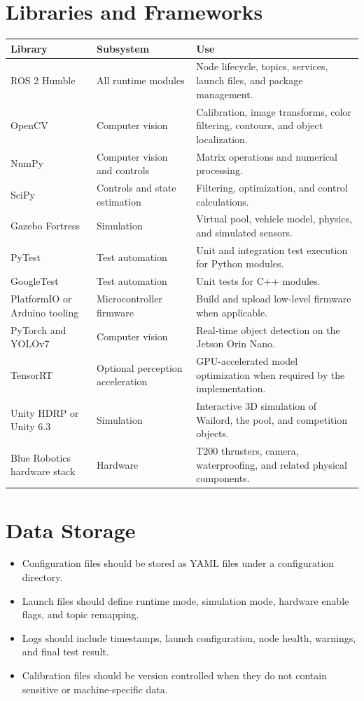 \documentclass[12pt]{article}
\begin{document}
\section{Libraries and Frameworks}
\begin{longtable}{|p{}|p{}|p{}|}
\hline
\textbf{Library} & \textbf{Subsystem} & \textbf{Use} \\
\hline
ROS 2 Humble & All runtime modules & Node lifecycle, topics, services, launch files, and package management. \\
\hline
OpenCV & Computer vision & Calibration, image transforms, color filtering, contours, and object localization. \\
\hline
NumPy & Computer vision and controls & Matrix operations and numerical processing. \\
\hline
SciPy & Controls and state estimation & Filtering, optimization, and control calculations. \\
\hline
Gazebo Fortress & Simulation & Virtual pool, vehicle model, physics, and simulated sensors. \\
\hline
PyTest & Test automation & Unit and integration test execution for Python modules. \\
\hline
GoogleTest & Test automation & Unit tests for C++ modules. \\
\hline
PlatformIO or Arduino tooling & Microcontroller firmware & Build and upload low-level firmware when applicable. \\
\hline
PyTorch and YOLOv7 & Computer vision & Real-time object detection on the Jetson Orin Nano. \\
\hline
TensorRT & Optional perception acceleration & GPU-accelerated model optimization when required by the implementation. \\
\hline
Unity HDRP or Unity 6.3 & Simulation & Interactive 3D simulation of Wailord, the pool, and competition objects. \\
\hline
Blue Robotics hardware stack & Hardware & T200 thrusters, camera, waterproofing, and related physical components. \\
\hline
\end{longtable}

\section{Data Storage}
\begin{itemize}[leftmargin=*]
  \item Configuration files should be stored as YAML files under a configuration directory.
  \item Launch files should define runtime mode, simulation mode, hardware enable flags, and topic remapping.
  \item Logs should include timestamps, launch configuration, node health, warnings, and final test result.
  \item Calibration files should be version controlled when they do not contain sensitive or machine-specific data.
\end{itemize}
\end{document}

